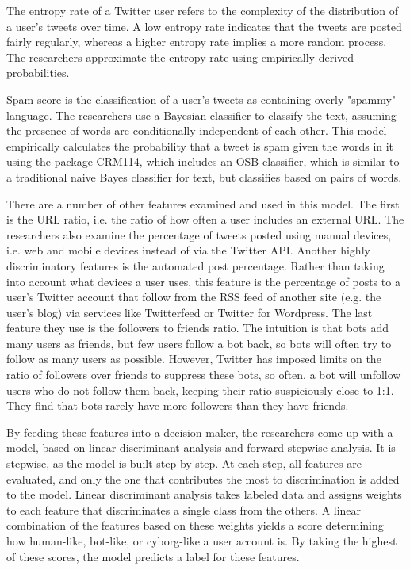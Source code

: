 \documentclass[11pt, oneside]{article}   	%
\begin{document}
\quad The entropy rate of a Twitter user refers to the complexity of the distribution of a user's tweets over time.
A low entropy rate indicates that the tweets are posted fairly regularly, whereas a higher entropy rate implies a more random process.
The researchers approximate the entropy rate using empirically-derived probabilities.

\quad Spam score is the classification of a user's tweets as containing overly "spammy" language.
The researchers use a Bayesian classifier to classify the text, assuming the presence of words are conditionally independent of each other.
This model empirically calculates the probability that a tweet is spam given the words in it using the package CRM114, which includes an OSB classifier, which is similar to a traditional naive Bayes classifier for text, but classifies based on pairs of words.

\quad There are a number of other features examined and used in this model.
The first is the URL ratio, i.e. the ratio of how often a user includes an external URL.
The researchers also examine the percentage of tweets posted using manual devices, i.e. web and mobile devices instead of via the Twitter API.
Another highly discriminatory features is the automated post percentage.
Rather than taking into account what devices a user uses, this feature is the percentage of posts to a user's Twitter account that follow from the RSS feed of another site (e.g. the user's blog) via services like Twitterfeed or Twitter for Wordpress.
The last feature they use is the followers to friends ratio.
The intuition is that bots add many users as friends, but few users follow a bot back, so bots will often try to follow as many users as possible.
However, Twitter has imposed limits on the ratio of followers over friends to suppress these bots, so often, a bot will unfollow users who do not follow them back, keeping their ratio suspiciously close to 1:1.
They find that bots rarely have more followers than they have friends.

\quad By feeding these features into a decision maker, the researchers come up with a model, based on linear discriminant analysis and forward stepwise analysis.
It is stepwise, as the model is built step-by-step.
At each step, all features are evaluated, and only the one that contributes the most to discrimination is added to the model.
Linear discriminant analysis takes labeled data and assigns weights to each feature that discriminates a single class from the others.
A linear combination of the features based on these weights yields a score determining how human-like, bot-like, or cyborg-like a user account is.
By taking the highest of these scores, the model predicts a label for these features.
\end{document}
